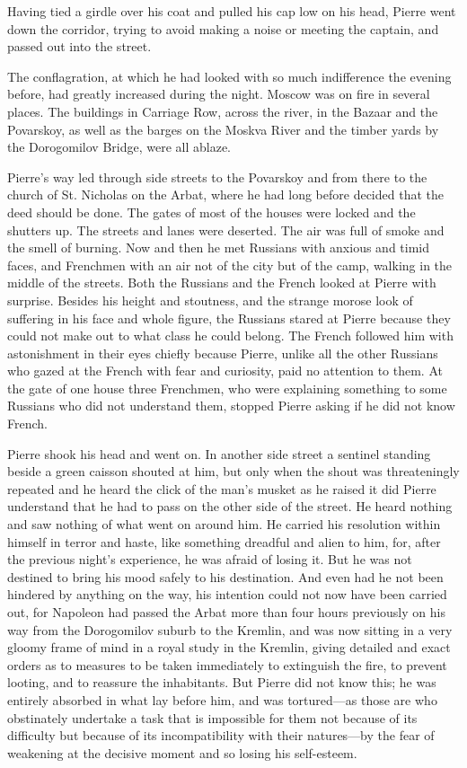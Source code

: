 Having tied a girdle over his coat and pulled his cap low on his
head, Pierre went down the corridor, trying to avoid making a
noise or meeting the captain, and passed out into the street.

The conflagration, at which he had looked with so much
indifference the evening before, had greatly increased during the
night. Moscow was on fire in several places. The buildings in
Carriage Row, across the river, in the Bazaar and the Povarskoy,
as well as the barges on the Moskva River and the timber yards by
the Dorogomilov Bridge, were all ablaze.

Pierre's way led through side streets to the Povarskoy and from
there to the church of St. Nicholas on the Arbat, where he had
long before decided that the deed should be done. The gates of
most of the houses were locked and the shutters up. The streets
and lanes were deserted.  The air was full of smoke and the smell
of burning. Now and then he met Russians with anxious and timid
faces, and Frenchmen with an air not of the city but of the camp,
walking in the middle of the streets. Both the Russians and the
French looked at Pierre with surprise. Besides his height and
stoutness, and the strange morose look of suffering in his face
and whole figure, the Russians stared at Pierre because they
could not make out to what class he could belong. The French
followed him with astonishment in their eyes chiefly because
Pierre, unlike all the other Russians who gazed at the French
with fear and curiosity, paid no attention to them. At the gate
of one house three Frenchmen, who were explaining something to
some Russians who did not understand them, stopped Pierre asking
if he did not know French.

Pierre shook his head and went on. In another side street a
sentinel standing beside a green caisson shouted at him, but only
when the shout was threateningly repeated and he heard the click
of the man's musket as he raised it did Pierre understand that he
had to pass on the other side of the street. He heard nothing and
saw nothing of what went on around him. He carried his resolution
within himself in terror and haste, like something dreadful and
alien to him, for, after the previous night's experience, he was
afraid of losing it. But he was not destined to bring his mood
safely to his destination. And even had he not been hindered by
anything on the way, his intention could not now have been
carried out, for Napoleon had passed the Arbat more than four
hours previously on his way from the Dorogomilov suburb to the
Kremlin, and was now sitting in a very gloomy frame of mind in a
royal study in the Kremlin, giving detailed and exact orders as
to measures to be taken immediately to extinguish the fire, to
prevent looting, and to reassure the inhabitants. But Pierre did
not know this; he was entirely absorbed in what lay before him,
and was tortured---as those are who obstinately undertake a task
that is impossible for them not because of its difficulty but
because of its incompatibility with their natures---by the fear
of weakening at the decisive moment and so losing his
self-esteem.

